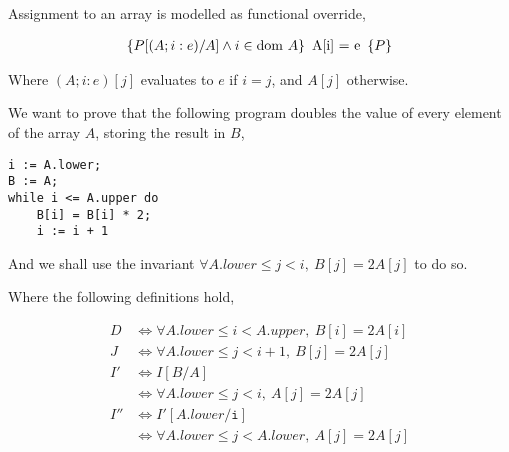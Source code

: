 \begin{definition}
  Assignment to an array is modelled as functional override,

  \begin{align*}
    \htriple{P[(A; i : e)/A] \land i \in \dom~A}{A[i] = e}{P}
  \end{align*}

  Where $(A; i : e)[j]$ evaluates to $e$ if $i = j$, and $A[j]$
  otherwise.
\end{definition}

\begin{example}
  \label{exmpl:heap-double}

  We want to prove that the following program doubles the value of
  every element of the array $A$, storing the result in $B$,

\begin{verbatim}
i := A.lower;
B := A;
while i <= A.upper do
    B[i] = B[i] * 2;
    i := i + 1
\end{verbatim}

  And we shall use the invariant $\forall A.lower \leq j < i,\ B[j]
  = 2 A[j]$ to do so.

  \begin{prooftree}




  \end{prooftree}

  Where the following definitions hold,

  \begin{align*}
    D &\iff \forall A.lower \leq i < A.upper,\ B[i] = 2 A[i]\\
    J &\iff \forall A.lower \leq j < i + 1,\ B[j] = 2 A[j]\\
    I' &\iff I[B/A]\\
    &\iff \forall A.lower \leq j < i,\ A[j] = 2 A[j]\\
    I'' &\iff I'[A.lower/\mathtt{i}]\\
    &\iff \forall A.lower \leq j < A.lower,\ A[j] = 2 A[j]
  \end{align*}
\end{example}


